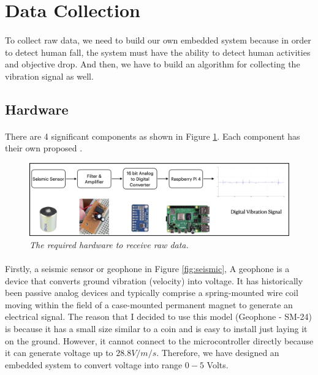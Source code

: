 \section{Data Collection}
\paragraph{}
To collect raw data, we need to build our own embedded system because in order to detect human fall, the system must have the ability to detect human activities and objective drop. And then, we have to build an algorithm for collecting the vibration signal as well.

\subsection{Hardware}
\paragraph{}
	There are 4 significant components as shown in Figure \ref{fig:hardware}. Each component has their own proposed \cite{dash_2020}.
    
 \begin{figure}[h]
  \centering
  \caption[The required hardware to receive raw data.]{\emph{The required hardware to receive raw data. \\}}\label{fig:hardware}
  \includegraphics[scale = 0.2]{figures/hardware.jpg}  
\end{figure}

\paragraph{}
Firstly, a seismic sensor or geophone in Figure \ref{fig:seismic}, A geophone is a device that converts ground vibration (velocity) into voltage. It has historically been passive analog devices and typically comprise a spring-mounted wire coil moving within the field of a case-mounted permanent magnet to generate an electrical signal. The reason that I decided to use this model (Geophone - SM-24) is because it has a small size similar to a coin and is easy to install just laying it on the ground. However, it cannot connect to the microcontroller directly because it can generate voltage up to $ 28.8 V / m/s$. Therefore, we have designed an embedded system to convert voltage into range $0 - 5$ Volts.

